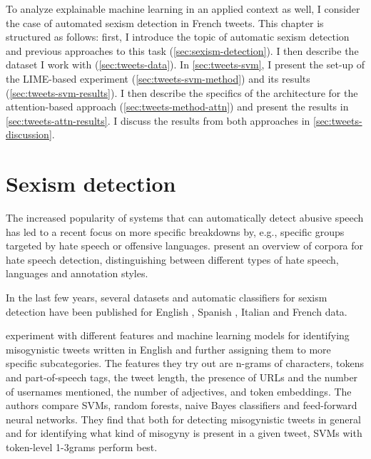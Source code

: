 \label{chap:tweets}

To analyze explainable machine learning in an applied context as well, I consider the case of automated sexism detection in French tweets.
This chapter is structured as follows:
first, I introduce the topic of automatic sexism detection and previous approaches to this task (\autoref{sec:sexism-detection}).
I then describe the dataset I work with (\autoref{sec:tweets-data}).
In \autoref{sec:tweets-svm}, I present the set-up of the LIME-based experiment (\autoref{sec:tweets-svm-method}) and its results (\autoref{sec:tweets-svm-results}).
I then describe the specifics of the architecture for the attention-based approach (\autoref{sec:tweets-method-attn}) and present the results in \autoref{sec:tweets-attn-results}.
I discuss the results from both approaches in \autoref{sec:tweets-discussion}.

\section{Sexism detection}
\label{sec:sexism-detection}

The increased popularity of systems that can automatically detect abusive speech has led to a recent focus on more specific breakdowns by, e.g., specific groups targeted by hate speech or offensive languages.
\citet{poletto2020resources} present an overview of corpora for hate speech detection, distinguishing between different types of hate speech, languages and annotation styles.

In the last few years, several datasets and automatic classifiers for sexism detection have been published for English \citep{jha2017compliment,anzovino2018automatic,fersini2018overview,frenda2019online},
Spanish \citep{fersini2018overview,rodriguez2020automatic},
Italian \citep{fersini2020ami} and 
French \citep{chiril2020annotated} data.

\citet{anzovino2018automatic} experiment with different features and machine learning models for identifying misogynistic tweets written in English and further assigning them to more specific subcategories.
The features they try out are n-grams of characters, tokens and part-of-speech tags, the tweet length, the presence of URLs and the number of usernames mentioned, the number of adjectives, and token embeddings.
The authors compare SVMs, random forests, naive Bayes classifiers and feed-forward neural networks.
They find that both for detecting misogynistic tweets in general and for identifying what kind of misogyny is present in a given tweet, SVMs with token-level 1-3grams perform best.

